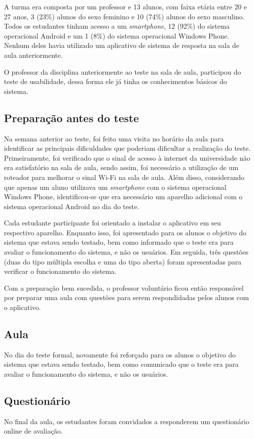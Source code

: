 A turma era composta por um professor e 13 alunos, com faixa etária entre 20 e 27 anos, 3 (23\%)
alunos do sexo feminino e 10 (74\%) alunos do sexo masculino. Todos os estudantes
tinham acesso a um \textit{smartphone}, 12 (92\%) do sistema operacional Android e um
1 (8\%) do sistema operacional Windows Phone.
Nenhum deles havia utilizado um aplicativo de sistema de resposta na sala de aula anteriormente.

O professor da disciplina anteriormente ao teste na sala de aula, participou do teste de usabilidade,
dessa forma ele já tinha os conhecimentos básicos do sistema.

\subsection{Preparação antes do teste}

Na semana anterior ao teste, foi feito uma visita no horário da aula para
identificar as principais dificuldades que poderiam dificultar a realização do teste.
Primeiramente, foi verificado que o sinal de acesso à internet da universidade não era
satisfatório na sala de aula, sendo assim, foi necessário a utilização de um roteador
para melhorar o sinal Wi-Fi na sala de aula.
Além disso, considerando que apenas um aluno utilizava um \textit{smartphone} com
o sistema operacional Windows Phone, identificou-se que era necessário um aparelho adicional com o
sistema operacional Android no dia do teste.

Cada estudante participante foi orientado a instalar o aplicativo em seu respectivo aparelho.
Enquanto isso, foi apresentado para os alunos o objetivo do sistema que estava sendo testado,
bem como informado que o teste era para avaliar o funcionamento do sistema, e não os usuários.
Em seguida, três questões (duas do tipo múltipla escolha e uma do tipo aberta)
foram apresentadas para verificar o funcionamento do sistema.

Com a preparação bem sucedida, o professor voluntário ficou então responsável por
preparar uma aula com questões para serem respondidadas pelos alunos com o aplicativo.

\subsection{Aula}

No dia do teste formal, novamente foi reforçado para os alunos o objetivo do sistema que estava sendo testado,
bem como comunicado que o teste era para avaliar o funcionamento do sistema, e não os usuários.

\subsection{Questionário}

No final da aula, os estudantes foram convidados a responderem um questionário online
de avaliação.
